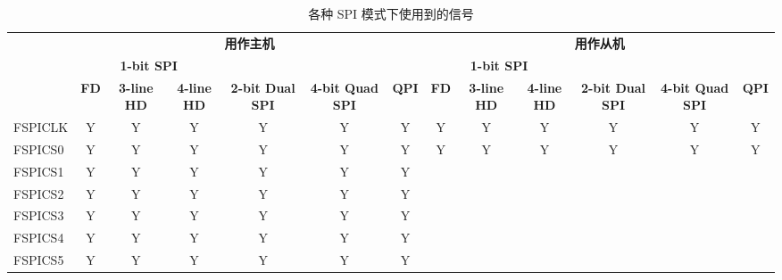 \documentclass[main\_\_CN.tex]{subfiles}
\begin{document}
\begin{landscape}
\begin{table}[H]
    \centering
    \caption{各种 SPI 模式下使用到的信号}
    \label{tab:spi-singals-used-in-various-spi-modes}

    \begin{threeparttable}
    \begin{tabular}{ |p{2.0cm} |c|c|c|c|c|c|c|c|c|c|c|c| }
    \hline
        \rowcolor{lightgray}
        & \multicolumn{6}{c|}{\textbf{用作主机}} & \multicolumn{6}{c|}{\textbf{用作从机}} \\\cline{2-13}
        \rowcolor{lightgray}
        & \multicolumn{3}{c|}{\textbf{1-bit SPI}} & & & & \multicolumn{3}{c|}{\textbf{1-bit SPI}} & & & \\ \cline{2-4} \cline{8-10}
        \rowcolor{lightgray}
        \multirow{-3}{*}{\textbf{FSPI 总线信号}} & \textbf{FD\tnote{1}} & \textbf{3-line HD\tnote{2}} & \textbf{4-line HD} & \multirow{-2}{*}{\textbf{2-bit Dual SPI}} & \multirow{-2}{*}{\textbf{4-bit Quad SPI}} & \multirow{-2}{*}{\textbf{QPI}} & \textbf{FD} & \textbf{3-line HD} & \textbf{4-line HD} & \multirow{-2}{*}{\textbf{2-bit Dual SPI}} & \multirow{-2}{*}{\textbf{4-bit Quad SPI}} & \multirow{-2}{*}{\textbf{QPI}} \\ \hline
FSPICLK                  & Y       & Y       & Y       & Y       & Y       & Y      & Y       & Y      & Y       & Y       & Y       & Y      \\ \hline
FSPICS0                  & Y       & Y       & Y       & Y       & Y       & Y      & Y       & Y      & Y       & Y       & Y       & Y      \\ \hline
FSPICS1                  & Y       & Y       & Y       & Y       & Y       & Y      &         &        &         &         &         &        \\ \hline
FSPICS2                  & Y       & Y       & Y       & Y       & Y       & Y      &         &        &         &         &         &        \\ \hline
FSPICS3                  & Y       & Y       & Y       & Y       & Y       & Y      &         &        &         &         &         &        \\ \hline
FSPICS4                  & Y       & Y       & Y       & Y       & Y       & Y      &         &        &         &         &         &        \\ \hline
FSPICS5                  & Y       & Y       & Y       & Y       & Y       & Y      &         &        &         &         &         &        \\ \hline

\end{tabular}
\end{threeparttable}
\end{table}
\end{landscape}
\end{document}
